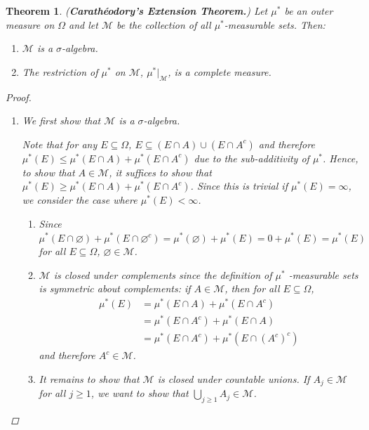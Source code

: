 \documentclass{article}
\newcommand{\M}{\mathcal{M}}
\theoremstyle{spaced}
\newtheorem{theorem}{Theorem}[section]
\begin{document}
\begin{theorem} (\textbf{Carathéodory's Extension Theorem.})
        Let $\mu^*$ be an outer measure on $\Omega$ and let $\M$ be the collection of all $\mu^*$-measurable sets. Then:        
        \begin{enumerate}
            \item $\M$ is a $\sigma$-algebra.
            \item The restriction of $\mu^*$ on $\M$, $\mu^*|_{\M}$, is a complete measure.
        \end{enumerate}
        
\begin{proof}    
    \begin{enumerate}
        \item We first show that $\M$ is a $\sigma$-algebra. 
        
        Note that for any $E \subseteq \Omega$, $E \subseteq (E \cap A) \cup (E \cap A^c)$ and therefore \\ $\mu^*(E) \leq \mu^*(E \cap A) + \mu^*(E \cap A^c)$ due to the sub-additivity of $\mu^*$. Hence, to show that $A \in \M$, it suffices to show that $\mu^*(E) \geq \mu^*(E \cap A) + \mu^*(E \cap A^c)$. Since this is trivial if $\mu^*(E) = \infty$, we consider the case where $\mu^*(E) < \infty$.

        \begin{enumerate}
            
            \item Since $\mu^*(E \cap \varnothing) + \mu^*(E \cap \varnothing^c) = \mu^*(\varnothing) + \mu^*(E) = 0 + \mu^*(E) = \mu^*(E)$ for all $E \subseteq\Omega$, $\varnothing \in \M$.
    
            \item $\M$ is closed under complements since the definition of $\mu^*$ -measurable sets is symmetric about complements: if $A \in \M$, then for all $E \subseteq \Omega$, 
            \begin{align*}
                \mu^*(E) &= \mu^*(E \cap A) + \mu^*(E \cap A^c) \\
                &= \mu^*(E \cap A^c) + \mu^*(E \cap A) \\
                &= \mu^*(E \cap A^c) + \mu^*(E \cap (A^c)^c)                 
            \end{align*}
            and therefore $A^c \in \M$.

            \item It remains to show that $\M$ is closed under countable unions. If $A_j \in \M$ for all $j \geq 1$, we want to show that $\bigcup_{j \geq 1} A_j \in \M$. 
            

\end{enumerate}
\end{enumerate}
\end{proof}
\end{theorem}
\end{document}
